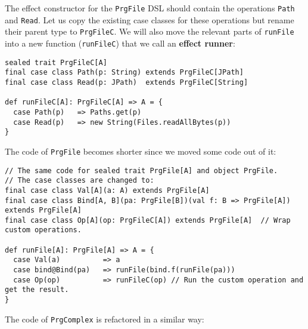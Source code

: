 The effect constructor for the \lstinline!PrgFile!
DSL should contain the operations \lstinline!Path!
and \lstinline!Read!. Let
us copy the existing case classes for these operations but rename
their parent type to \lstinline!PrgFileC!.
We will also move the relevant parts of \lstinline!runFile!
into a new function (\lstinline!runFileC!)
that we call an \textbf{effect runner}:
\begin{lstlisting}
sealed trait PrgFileC[A]
final case class Path(p: String) extends PrgFileC[JPath]
final case class Read(p: JPath)  extends PrgFileC[String]
  
def runFileC[A]: PrgFileC[A] => A = {
  case Path(p)   => Paths.get(p)
  case Read(p)   => new String(Files.readAllBytes(p))
}
\end{lstlisting}
The code of \lstinline!PrgFile!
becomes shorter since we moved some code out of it:
\begin{lstlisting}
// The same code for sealed trait PrgFile[A] and object PrgFile.
// The case classes are changed to:
final case class Val[A](a: A) extends PrgFile[A]
final case class Bind[A, B](pa: PrgFile[B])(val f: B => PrgFile[A]) extends PrgFile[A]
final case class Op[A](op: PrgFileC[A]) extends PrgFile[A]  // Wrap custom operations.

def runFile[A]: PrgFile[A] => A = {
  case Val(a)          => a
  case bind@Bind(pa)   => runFile(bind.f(runFile(pa)))
  case Op(op)          => runFileC(op) // Run the custom operation and get the result.
}
\end{lstlisting}
The code of \lstinline!PrgComplex!
is refactored in a similar way:
